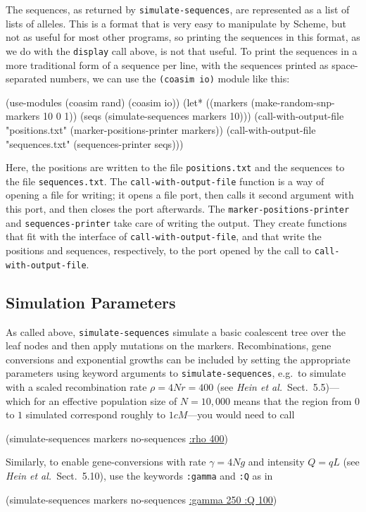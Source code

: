 \documentclass{manual}
\begin{document}
\begin{empfile}
The sequences, as returned by \texttt{simulate-sequences}, are
represented as a list of lists of alleles.  This is a format that is
very easy to manipulate by Scheme, but not as useful for most other
programs, so printing the sequences in this format, as we do with the
\texttt{display} call above, is not that useful.  To print the
sequences in a more traditional form of a sequence per line, with the
sequences printed as space-separated numbers, we can use the
\texttt{(coasim io)} module like this:
\begin{code}
(use-modules (coasim rand) (coasim io))
(let* ((markers (make-random-snp-markers 10 0 1))
       (seqs (simulate-sequences markers 10)))
  (call-with-output-file "positions.txt" (marker-positions-printer markers))
  (call-with-output-file "sequences.txt" (sequences-printer seqs)))
\end{code}
Here, the positions are written to the file \texttt{positions.txt} and
the sequences to the file \texttt{sequences.txt}.  The
\texttt{call-with-output-file} function is a way of opening a file for
writing; it opens a file port, then calls it second argument with this
port, and then closes the port afterwards.  The
\texttt{marker-positions-printer} and \texttt{sequences-printer} take
care of writing the output.  They create functions that fit with the
interface of \texttt{call-with-output-file}, and that write the
positions and sequences, respectively, to the port opened by
the call to \texttt{call-with-output-file}.


\subsection{Simulation Parameters}
\label{sec:simul-param}

As called above, \texttt{simulate-sequences} simulate a basic
coalescent tree over the leaf nodes and then apply mutations on the
markers.  Recombinations, gene conversions and exponential growths can
be included by setting the appropriate parameters using keyword
arguments to \texttt{simulate-sequences}, e.g.\ to simulate with a
scaled recombination rate $\rho=4Nr=400$ (see \emph{Hein et al.}\ 
Sect.~5.5)---which for an effective population size of $N=10,000$
means that the region from $0$ to $1$ simulated correspond roughly to
$1cM$---you would need to call
\begin{code}
(simulate-sequences markers no-sequences \underline{:rho 400})
\end{code}

Similarly, to enable gene-conversions with rate $\gamma=4Ng$ and
intensity $Q=qL$ (see \emph{Hein et al.}\ Sect.~5.10), use the
keywords \texttt{:gamma} and \texttt{:Q} as in
\begin{code}
(simulate-sequences markers no-sequences \underline{:gamma 250 :Q 100})
\end{code}


\end{empfile}
\end{document}
